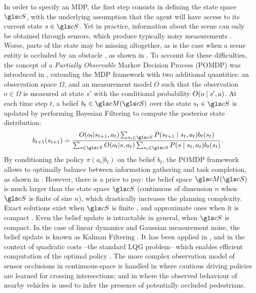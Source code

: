 In order to specify an \gls{MDP}, the first step consists in defining the state space $\cS$, with the underlying assumption that the agent will have access to its current state $s\in\cS$. Yet in practice, information about the scene can only be obtained through sensors, which produce typically noisy measurements \citep{Ulbrich2013,Du2010}. Worse, parts of the state may be missing altogether, as is the case when a scene entity is occluded by an obstacle \citep[\eg][]{Brechtel2013,Bouton2018,Sun2019}, as shown in . To account for these difficulties, the concept of a \emph{Partially Observable} Markov Decision Process (POMDP) was introduced in \citep{Astrom1965}, extending the MDP framework with two additional quantities: an observation space $\Omega$, and an measurement model $O$ such that the observation $o\in\Omega$ is measured at state $s'$ with the conditional probability $O\lparen o\mid s',a\rparen$. At each time step $t$, a belief $b_t\in\cM(\cS)$ over the state $s_t\in \cS$ is updated by performing Bayesian Filtering to compute the posterior state distribution:
\begin{equation*}
b_{t+1}(s_{t+1}) = \frac{O(o_t|s_{t+1}, a_t)\sum_{s_{t}\in\cS}P\parentheses{s_{t+1} \mid s_t, a_t}b_t(s_t)}{\sum_{s\in\cS} O(o_t|s, a_t)\sum_{s_{t}\in\cS}P\parentheses{s \mid s_t, a_t}b_t(s_t)}.
\end{equation*}
By conditioning the policy $\pi(a_t|b_t)$ on the belief $b_t$, the POMDP framework allows to optimally balance between information gathering and task completion, as shown in . However, there is a price to pay: the belief space $\cM(\cS)$ is much larger than the state space $\cS$ (\eg continuous of dimension $n$ when $\cS$ is finite of size $n$), which drastically increases the planning complexity. Exact solutions exist when $\cS$ is finite \citep{Pineau2003}, and approximate ones when it is compact \citep{Porta2006,Silver2010}. Even the belief update is intractable in general, when $\cS$ is compact. In the case of linear dynamics and Gaussian measurement noise, the belief update is known as Kalman Filtering \citep{Kalman1960}. It has been applied in \citep[\eg]{Bry2011,Bouton2017,VanDenBerg2017}, and in the context of quadratic costs --\ie the standard LQG problem-- which enables efficient computation of the optimal policy \citep[see e.g.][]{Xu2014,VanDenBerg2011}. The more complex observation model of sensor occlusions in continuous-space is handled in \citep{Brechtel2013,Brechtel2014,Bouton2018} where cautious driving policies are learned for crossing intersections; and in \citep[][]{Sun2019} where the observed behaviour of nearby vehicles is used to infer the presence of potentially occluded pedestrians.
